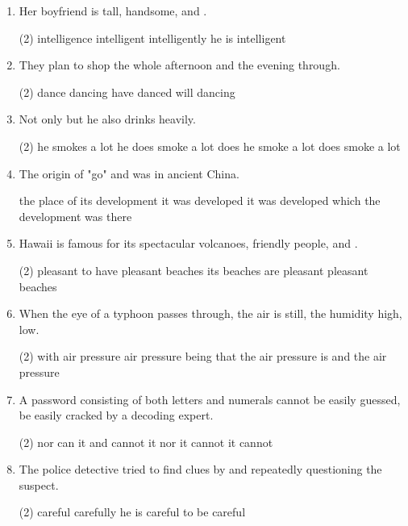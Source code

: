 \begin{enumerate}
\item Her boyfriend is tall, handsome, and \ttu .
\begin{tasks}(2)
  \task intelligence
  \task intelligent
  \task intelligently
  \task he is intelligent
\end{tasks}

\item They plan to shop the whole afternoon and \ttu the evening through.
\begin{tasks}(2)
  \task dance
  \task dancing
  \task have danced
  \task will dancing
\end{tasks}

\item Not only \ttu but he also drinks heavily.
\begin{tasks}(2)
  \task he smokes a lot
  \task he does smoke a lot
  \task does he smoke a lot
  \task does smoke a lot
\end{tasks}

\item The origin of "go" and \ttu was in ancient China.
\begin{tasks}
  \task the place of its development
  \task it was developed
  \task it was developed which
  \task the development was there
\end{tasks}

\item Hawaii is famous for its spectacular volcanoes, friendly people, and \ttu.
\begin{tasks}(2)
  \task pleasant
  \task to have pleasant beaches
  \task its beaches are pleasant
  \task pleasant beaches
\end{tasks}

\item When the eye of a typhoon passes through, the air is still, the humidity high, \ttu low.
\begin{tasks}(2)
  \task with air pressure
  \task air pressure being
  \task that the air pressure is
  \task and the air pressure
\end{tasks}

\item A password consisting of both letters and numerals cannot be easily guessed, \ttu be easily cracked by a decoding expert.
\begin{tasks}(2)
  \task nor can it
  \task and cannot it
  \task nor it cannot
  \task it cannot
\end{tasks}

\item The police detective tried to find clues by \ttu and repeatedly questioning the suspect.
\begin{tasks}(2)
  \task careful
  \task carefully
  \task he is careful
  \task to be careful
\end{tasks}


\end{enumerate}
